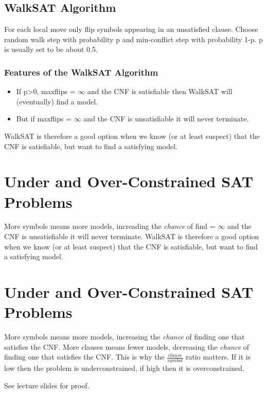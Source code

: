 \documentclass[11pt]{article}
\begin{document}
\subsection{WalkSAT Algorithm}
\label{sec:org5701be4}
For each local move only flip symbols appearing in an unsatisfied clause.
Choose random walk step with probability p and min-conflict step with probability 1-p.
p is usually set to be about 0.5.

\subsubsection{Features of the WalkSAT Algorithm}
\label{sec:orgddfb1c1}
\begin{itemize}
\item If p>0, max\textunderscore flips = \(\infty\) and the CNF is satisfiable then WalkSAT will (eventually) find a model.
\item But if max\textunderscore flips  = \(\infty\) and the CNF is unsatisfiable it will never terminate.
\end{itemize}
WalkSAT is therefore a good option when we know (or at least suspect) that the CNF is satisfiable, but want to find a satisfying model.

\section{Under and Over-Constrained SAT Problems}
\label{sec:org6be04df}
More symbols means more models, increading the \emph{chance} of find = \(\infty\) and the CNF is unsatisfiable it will never terminate.
WalkSAT is therefore a good option when we know (or at least suspect) that the CNF is satisfiable, but want to find a satisfying model.

\section{Under and Over-Constrained SAT Problems}
\label{sec:orgef2ce55}
More symbols means more models, increasing the \emph{chance} of finding one that satisfies the CNF.
More clauses means fewer models, decreasing the \emph{chance} of finding one that satisfies the CNF.
This is why the \(\frac{clause}{symbol}\) ratio matters.
If it is low then the problem is underconstrained, if high then it is overconstrained.

See lecture slides for proof.
\end{document}
